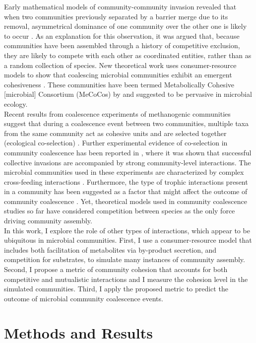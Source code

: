 \documentclass[titlepage,11pt]{article}
\begin{document}
\begin{linenumbers}
\begin{singlespace}
			Early mathematical models of community-community invasion revealed that when two communities previously separated by a barrier merge due to its removal, asymmetrical dominance of one community over the other one is likely to occur \citep{Gilpin1994, Toquenaga1997}. As an explanation for this observation, it was argued that, because communities have been assembled through a history of competitive exclusion, they are likely to compete with each other as coordinated entities, rather than as a random collection of species. New theoretical work uses consumer-resource models to show that coalescing microbial communities exhibit an emergent cohesiveness \citep{Tikhonov2016, Tikhonov2017}. These communities have been termed Metabolically Cohesive [microbial] Consortium (MeCoCos) by \citet{Pascual-Garcia2020} and suggested to be pervasive in microbial ecology.\\ Recent results from coalescence experiments of methanogenic communities suggest that during a coalescence event between two communities, multiple taxa from the same community act as cohesive units and are selected together (ecological co-selection) \citep{Sierocinski2017}. Further experimental evidence of co-selection in community coalescence has been reported in \citet{Lu2018}, where it was shown that successful collective invasions are accompanied by strong community-level interactions. The microbial communities used in these experiments are characterized by complex cross-feeding interactions \citep{Hansen2007, Lawrence2012, Embree2015}. Furthermore, the type of trophic interactions present in a community has been suggested as a factor that might affect the outcome of community coalescence \citep{Castledine2020}.  Yet, theoretical models used in community coalescence studies so far have considered competition between species as the only force driving community assembly.\\
			In this work, I explore the role of other types of interactions, which appear to be ubiquitous in microbial communities. First, I use a consumer-resource model that includes both facilitation of metabolites via by-product secretion, and competition for substrates, to simulate many instances of community assembly. Second, I propose a metric of community cohesion that accounts for both competitive and mutualistic interactions and I measure the cohesion level in the simulated communities. Third, I apply the proposed metric to predict the outcome of microbial community coalescence events.
		\section{Methods and Results}

\end{singlespace}
\end{linenumbers}
\end{document}

